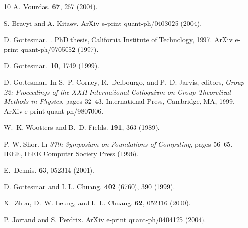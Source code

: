 \documentclass[aps,twocolumn,showpacs,nofootinbib,groupedaddress]{revtex4}
\begin{document}
\begin{thebibliography}{10}
A.~Vourdas.
 \textbf{67}, 267 (2004).

S. Bravyi and A. Kitaev.
\newblock ArXiv e-print quant-ph/0403025 (2004).

D. Gottesman.
.
\newblock PhD thesis, California Institute of Technology, 1997.
\newblock ArXiv e-print quant-ph/9705052 (1997).

D. Gottesman.
 \textbf{10}, 1749 (1999).

D. Gottesman.
\newblock In S.~P. Corney, R.~Delbourgo, and P.~D. Jarvis, editors, {\em Group
  22: Proceedings of the XXII International Colloquium on Group Theoretical
  Methods in Physics}, pages 32--43. International Press, Cambridge, MA, 1999.
\newblock ArXiv e-print quant-ph/9807006.

W.~K. Wootters and B.~D. Fields.
 \textbf{191}, 363 (1989).

P. W. Shor.
\newblock In {\em 37th Symposium on Foundations of Computing}, pages 56--65.
  IEEE, IEEE Computer Society Press (1996).

E.~Dennis.
 \textbf{63}, 052314 (2001).

D. Gottesman and I. L. Chuang.
 \textbf{402} (6760), 390 (1999).

X.~Zhou, D.~W. Leung, and I.~L. Chuang.
 \textbf{62}, 052316 (2000).

P. Jorrand and S. Perdrix.
\newblock ArXiv e-print quant-ph/0404125 (2004).


\end{thebibliography}
\end{document}
